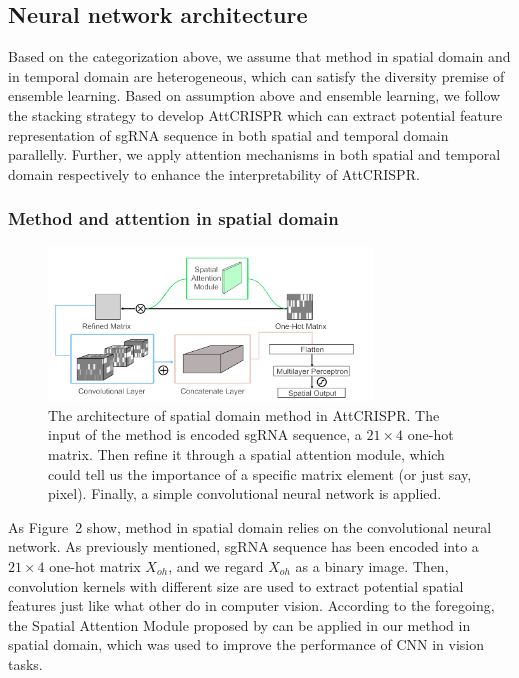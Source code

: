 \documentclass{bioinfo}
\begin{document}
\subsection{Neural network architecture}

Based on the categorization above, we assume that method in spatial domain and in temporal domain are heterogeneous, 
which can satisfy the diversity premise of ensemble learning. 
Based on assumption above and ensemble learning, we follow the stacking strategy to develop AttCRISPR 
which can extract potential feature representation of sgRNA sequence in both spatial and temporal domain parallelly. 
Further, we apply attention mechanisms in both spatial and temporal domain respectively to enhance the interpretability of AttCRISPR.

\subsubsection{Method and attention in spatial domain}

\begin{figure}[!tpb]%
    \centerline{\includegraphics[width=86mm]{CNNv2.png}}
    \caption{The architecture of spatial domain method in AttCRISPR. 
    The input of the method is encoded sgRNA sequence, a $21\times 4$ one-hot matrix. 
    Then refine it through a spatial attention module, which could tell us the importance of a specific matrix element (or just say, pixel).
    Finally, a simple convolutional neural network is applied.}\label{fig:02}
\end{figure}
As Figure~2\vphantom{\ref{fig:02}} show, method in spatial domain relies on the convolutional neural network. 
As previously mentioned, sgRNA sequence has been encoded into a $21\times 4$ one-hot matrix $X_{oh}$, and we regard $X_{oh}$ as a binary image. 
Then, convolution kernels with different size are used to extract potential spatial features just like what other do in computer vision. 
According to the foregoing, the Spatial Attention Module proposed by \citeauthor{woo2018cbam:} can be applied in our method in spatial domain, 
which was used to improve the performance of CNN in vision tasks.
\end{document}
